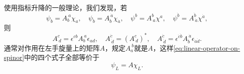 \documentclass[hyperref, UTF8, a4paper]{ctexart}
\begin{document}
使用指标升降的一般理论，我们发现，若
\begin{equation}
    \psi_b = A_b^{\ a} \chi_a, \quad \psi_{\dot{b}} = A_{\dot{b}}^{\ \dot{a}} \chi_{\dot{a}}, \quad \psi^b = A^b_{\ a} \chi^a, \quad \psi^{\dot{b}} = A^{\dot{b}}_{\ \dot{a}} \chi^{\dot{a}},
    \label{eq:linear-operator-on-spinor}
\end{equation}
则
\begin{equation}
    A^c_{\ d} = \epsilon^{cb} A_{b}^{\ a}\epsilon_{ad}, \quad A^{\dot{c}}_{\ \dot{d}} = (A^c_{\ d})^*, \quad A^{\dot{c}}_{\ \dot{d}} = \epsilon^{\dot{c} \dot{b}} A_{\dot{b}}^{\ \dot{a}} \epsilon_{\dot{a}\dot{d}}.
    \label{eq:left-right-matrix-transform}
\end{equation}
通常对作用在左手旋量上的矩阵$A$，规定$A_a^{\ b}$就是$A$，这样\eqref{eq:linear-operator-on-spinor}中的四个式子全部等价于
\[
    \psi_L = A \chi_L.
\]
\end{document}
